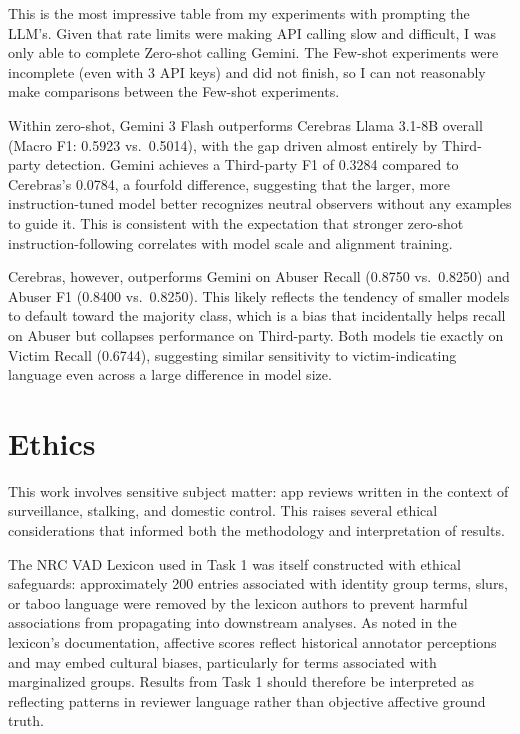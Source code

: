 \documentclass[12pt]{article}
\begin{document}
This is the most impressive table from my experiments with prompting the LLM's. Given that rate limits 
were making API calling slow and difficult, I was only able to complete Zero-shot calling Gemini. 
The Few-shot experiments were incomplete (even with 3 API keys) and did not finish, so I can not reasonably 
make comparisons between the Few-shot experiments.

Within zero-shot, Gemini 3 Flash outperforms Cerebras Llama 3.1-8B overall 
(Macro F1: 0.5923 vs.\ 0.5014), with the gap driven almost entirely by Third-party detection. Gemini 
achieves a Third-party F1 of 0.3284 compared to Cerebras's 0.0784, a fourfold difference, suggesting 
that the larger, more instruction-tuned model better recognizes neutral observers without any examples 
to guide it. This is consistent with the expectation that stronger zero-shot instruction-following 
correlates with model scale and alignment training.

Cerebras, however, outperforms Gemini on Abuser Recall (0.8750 vs.\ 0.8250) and Abuser F1 
(0.8400 vs.\ 0.8250). This likely reflects the tendency of smaller models to default toward the 
majority class, which is a bias that incidentally helps recall on Abuser but collapses performance on 
Third-party. Both models tie exactly on Victim Recall (0.6744), suggesting similar sensitivity to 
victim-indicating language even across a large difference in model size.

\section{Ethics}

This work involves sensitive subject matter: app reviews written in the context of 
surveillance, stalking, and domestic control. This raises several ethical 
considerations that informed both the methodology and interpretation of results.

The NRC VAD Lexicon used in Task 1 was itself constructed with ethical safeguards: 
approximately 200 entries associated with identity group terms, slurs, or taboo 
language were removed by the lexicon authors to prevent harmful associations 
from propagating into downstream analyses. As noted in the lexicon's documentation, 
affective scores reflect historical annotator perceptions and may embed cultural 
biases, particularly for terms associated with marginalized groups. Results from 
Task 1 should therefore be interpreted as reflecting patterns in reviewer 
language rather than objective affective ground truth.
\end{document}
